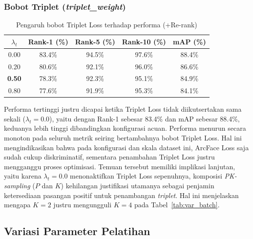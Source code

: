 \subsubsection{Bobot Triplet (\textit{triplet\_weight})}

\begin{table}[H]
    \centering
    \caption{Pengaruh bobot Triplet Loss terhadap performa (+Re-rank)}
    \label{tab:var_tripletweight}
    \renewcommand{\arraystretch}{1.25}
    \begin{tabular}{ccccc}
        \hline
        $\lambda_t$     & \textbf{Rank-1 (\%)} & \textbf{Rank-5 (\%)} & \textbf{Rank-10 (\%)} & \textbf{mAP (\%)} \\
        \hline
        0{.}00          & 83.4\%               & 94.5\%               & 97.6\%                & 88.4\%            \\
        0{.}20          & 80.6\%               & 92.1\%               & 96.0\%                & 86.6\%            \\
        \textbf{0{.}50} & 78.3\%               & 92.3\%               & 95.1\%                & 84.9\%            \\
        0{.}80          & 77.6\%               & 91.9\%               & 95.3\%                & 84.1\%            \\
        \hline
    \end{tabular}
\end{table}

Performa tertinggi justru dicapai ketika Triplet Loss tidak diikutsertakan sama sekali ($\lambda_t=0{.}0$), yaitu dengan Rank-1 sebesar 83.4\% dan mAP sebesar 88.4\%, keduanya lebih tinggi dibandingkan konfigurasi acuan. Performa menurun secara monoton pada seluruh metrik seiring bertambahnya bobot Triplet Loss. Hal ini mengindikasikan bahwa pada konfigurasi dan skala dataset ini, ArcFace Loss saja sudah cukup diskriminatif, sementara penambahan Triplet Loss justru mengganggu proses optimisasi. Temuan tersebut memiliki implikasi lanjutan, yaitu karena $\lambda_t=0{.}0$ menonaktifkan Triplet Loss sepenuhnya, komposisi \textit{PK-sampling} ($P$ dan $K$) kehilangan justifikasi utamanya sebagai penjamin ketersediaan pasangan positif untuk penambangan \textit{triplet}. Hal ini menjelaskan mengapa $K=2$ justru mengungguli $K=4$ pada Tabel~\ref{tab:var_batch}.

\subsection{Variasi Parameter Pelatihan}

